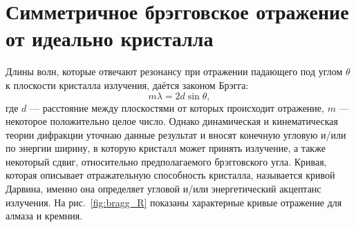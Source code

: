 \section{Симметричное брэгговское отражение от идеально кристалла}
Длины волн, которые отвечают резонансу при отражении падающего под углом $\theta$ к плоскости кристалла излучения, даётся законом Брэгга:  
\begin{equation}
	m\lambda = 2d\sin\theta,
\end{equation}
где $d$ --- расстояние между плоскостями от которых происходит отражение, $m$ --- некоторое положительно целое число. Однако динамическая и кинематическая теории дифракции уточнаю данные результат и вносят конечную угловую и/или по энергии ширину, в которую кристалл может принять излучение, а также некоторый сдвиг, относительно предполагаемого брэгговского угла.  Кривая, которая описывает отражательную способность кристалла, называется кривой Дарвина, именно она определяет угловой и/или энергетический акцептанс излучения. На рис.~\ref{fig:bragg_R} показаны характерные кривые отражение для алмаза и кремния. 
